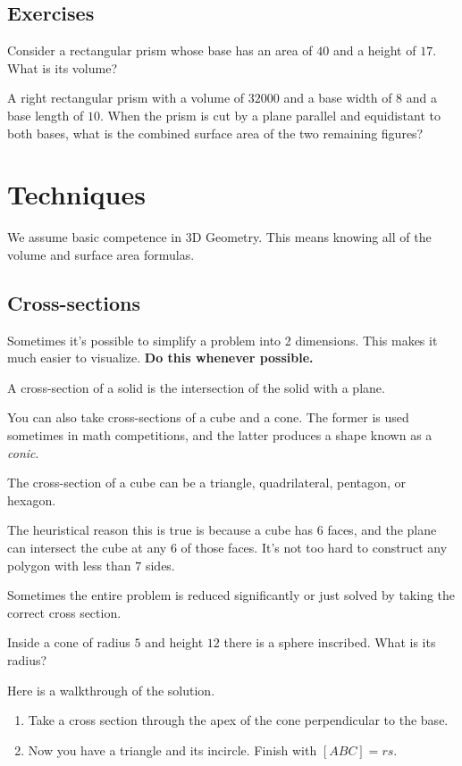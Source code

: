 \documentclass[mast]{lucky}
\begin{document}
\subsection{Exercises}


\begin{exer}
Consider a rectangular prism whose base has an area of $40$ and a height of $17.$ What is its volume?
\end{exer}
\begin{exer}
A right rectangular prism with a volume of $32000$ and a base width of $8$ and a base length of $10.$ When the prism is cut by a plane parallel and equidistant to both bases, what is the combined surface area of the two remaining figures?
\end{exer}


\section{Techniques}
We assume basic competence in 3D Geometry. This means knowing all of the volume and surface area formulas.

\subsection{Cross-sections}
Sometimes it's possible to simplify a problem into 2 dimensions. This makes it much easier to visualize. \textbf{Do this whenever possible.}

\begin{defi}
A cross-section of a solid is the intersection of the solid with a plane.
\end{defi}

You can also take cross-sections of a cube and a cone. The former is used sometimes in math competitions, and the latter produces a shape known as a \textit{conic}.

\begin{theo}
The cross-section of a cube can be a triangle, quadrilateral, pentagon, or hexagon.
\end{theo}

The heuristical reason this is true is because a cube has $6$ faces, and the plane can intersect the cube at any $6$ of those faces. It's not too hard to construct any polygon with less than $7$ sides.

Sometimes the entire problem is reduced significantly or just solved by taking the correct cross section.

\begin{exam}
Inside a cone of radius $5$ and height $12$ there is a sphere inscribed. What is its radius?
\end{exam}
\begin{sol}
Here is a walkthrough of the solution.
\begin{enumerate}
    \item Take a cross section through the apex of the cone perpendicular to the base.
    
    \item Now you have a triangle and its incircle. Finish with $[ABC]=rs.$
\end{enumerate}
\end{sol}
\end{document}

